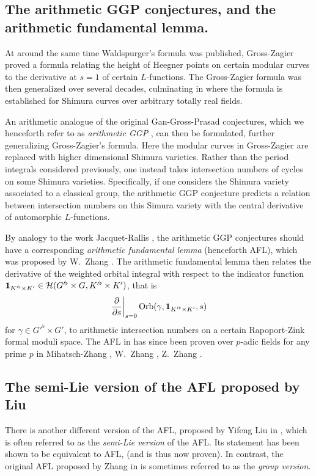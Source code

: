 \subsection{The arithmetic GGP conjectures, and the arithmetic fundamental lemma.}
At around the same time Waldspurger's formula was published,
Gross-Zagier \cite{ref:gross_zagier} proved a formula
relating the height of Heegner points
on certain modular curves to the derivative at $s=1$ of certain $L$-functions.
The Gross-Zagier formula was then generalized over several decades,
culminating in \cite{ref:GZshimura} where the formula is established
for Shimura curves over arbitrary totally real fields.

An arithmetic analogue of the original Gan-Gross-Prasad conjectures,
which we henceforth refer to as \emph{arithmetic GGP} \cite{ref:GGP},
can then be formulated, further generalizing Gross-Zagier's formula.
Here the modular curves in Gross-Zagier
are replaced with higher dimensional Shimura varieties.
Rather than the period integrals considered previously,
one instead takes intersection numbers of cycles on some Shimura varieties.
Specifically, if one considers the Shimura variety associated to a classical group,
the arithmetic GGP conjecture predicts a relation between intersection numbers
on this Simura variety with the central derivative of automorphic $L$-functions.

By analogy to the work Jacquet-Rallis \cite{ref:JR},
the arithmetic GGP conjectures should have a corresponding
\emph{arithmetic fundamental lemma} (henceforth AFL),
which was proposed by W.\ Zhang \cite[Conjecture 2.9]{ref:AFL}.
The arithmetic fundamental lemma then relates the derivative
of the weighted orbital integral with respect to the indicator function
$\mathbf{1}_{K'^\flat \times K'} \in \mathcal H(G'^\flat \times G, K'^\flat \times K')$, that is
\[ \left. \pdv{}{s} \right\rvert_{s=0} \operatorname{Orb}(\gamma, \mathbf{1}_{K'^\flat \times K'}, s) \]
for $\gamma \in G'^\flat \times G'$,
to arithmetic intersection numbers on a certain Rapoport-Zink formal moduli space.
The AFL in \cite{ref:AFL} has since been proven over $p$-adic fields for any prime $p$ in
Mihatsch-Zhang \cite{ref:MZ2021}, W.\ Zhang \cite{ref:Wei2021}, Z.\ Zhang \cite{ref:Zhiyu}.

\subsection{The semi-Lie version of the AFL proposed by Liu}
There is another different version of the AFL, proposed by Yifeng Liu in
\cite[Conjecture 1.12]{ref:liuFJ},
which is often referred to as the \emph{semi-Lie version} of the AFL.
Its statement has been shown to be equivalent to AFL,
\cite[Remark 1.13]{ref:liuFJ} (and is thus now proven).
In contrast, the original AFL proposed by Zhang in \cite[Conjecture 2.9]{ref:AFL}
is sometimes referred to as the \emph{group version}.


